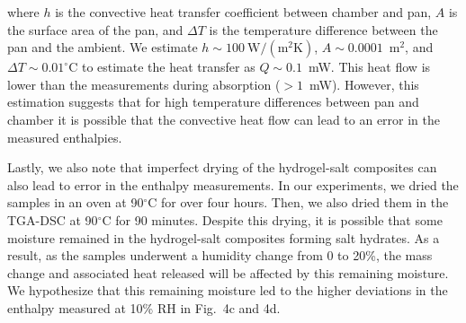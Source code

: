 \documentclass[11pt]{article}
\begin{document}
where $h$ is the convective heat transfer coefficient between chamber and pan, $A$ is the surface area of the pan, and $\Delta T$ is the temperature difference between the pan and the ambient. We estimate $h\sim100~\mathrm{W/(m^2 K)}$, $A\sim0.0001$~m$^2$, and $\Delta T\sim0.01^\circ$C to estimate the heat transfer as $Q\sim0.1$~mW. This heat flow is lower than the measurements during absorption ($>1$~mW). However, this estimation suggests that for high temperature differences between pan and chamber it is possible that the convective heat flow can lead to an error in the measured enthalpies.

Lastly, we also note that imperfect drying of the hydrogel-salt composites can also lead to error in the enthalpy measurements. In our experiments, we dried the samples in an oven at 90$^\circ$C for over four hours. Then, we also dried them in the TGA-DSC at 90$^\circ$C for 90 minutes. Despite this drying, it is possible that some moisture remained in the hydrogel-salt composites forming salt hydrates. As a result, as the samples underwent a humidity change from 0 to 20\%, the mass change and associated heat released will be affected by this remaining moisture. We hypothesize that this remaining moisture led to the higher deviations in the enthalpy measured at 10\% RH in Fig.~4c and 4d.

\clearpage
\end{document}
